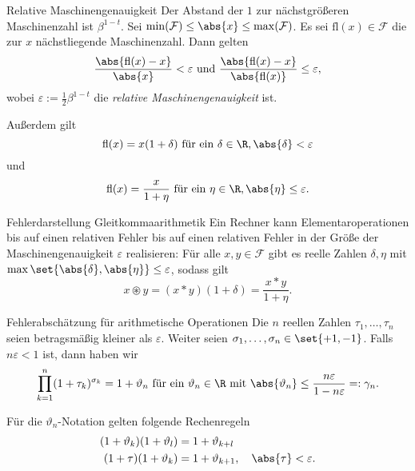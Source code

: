 \begin{karte}{Relative Maschinengenauigkeit}
    Der Abstand der \(1\) zur nächstgrößeren Maschinenzahl ist \( \beta^{1-t} \).
    Sei \( \min(\mathcal{F}) \leq \abs{x} \leq \max(\mathcal{F}) \). 
    Es sei \( \mathrm{fl}(x) \in \mathcal{F} \) die zur \(x\) nächstliegende Maschinenzahl.
    Dann gelten 
    \[ \frac{ \abs{\mathrm{fl}(x) - x} }{ \abs{x} } < \varepsilon \text{ und } 
    \frac{ \abs{ \mathrm{fl}(x) - x } }{\abs{ \mathrm{fl}(x) }} \leq \varepsilon,  \]
    wobei \( \varepsilon := \frac{1}{2} \beta^{1-t} \) die \textit{relative Maschinengenauigkeit} ist.

    Außerdem gilt 
    \[ \mathrm{fl}(x) = x(1 + \delta) \text{ für ein } \delta \in \R, \abs{\delta} < \varepsilon \]
    und 
    \[ \mathrm{fl}(x) = \frac{x}{1 + \eta} \text{ für ein } \eta \in \R, \abs{\eta} \leq \varepsilon. \]
\end{karte}

\begin{karte}{Fehlerdarstellung Gleitkommaarithmetik}
    Ein Rechner kann Elementaroperationen bis auf einen relativen Fehler bis auf einen 
    relativen Fehler in der Größe der Maschinengenauigkeit \( \varepsilon \) realisieren: 
    Für alle \( x,y\in \mathcal{F} \) gibt es reelle Zahlen \( \delta, \eta \) mit 
    \( \max\set{\abs{\delta}, \abs{\eta}} \leq \varepsilon \), sodass gilt 
    \[ x \circledast y = (x \ast y)(1 + \delta) = \frac{x \ast y}{1 + \eta}. \]
\end{karte}

\begin{karte}{Fehlerabschätzung für arithmetische Operationen}
    Die \( n \) reellen Zahlen \( \tau_1,\ldots, \tau_n \) seien betragsmäßig 
    kleiner als \( \varepsilon \). Weiter seien \( \sigma_1,\ldots,\sigma_n \in \set{+1,-1} \).
    Falls \( n\varepsilon < 1 \) ist, dann haben wir 
    \[ \prod_{k=1}^n (1 + \tau_k)^{\sigma_k} = 1 + \vartheta_n \text{ für ein } 
    \vartheta_n \in \R \text{ mit }
    \abs{ \vartheta_n } \leq \frac{n \varepsilon}{ 1 - n\varepsilon } =: \gamma_n. \]

    Für die \( \vartheta_n \)-Notation gelten folgende Rechenregeln 
    \begin{align*}
        (1 + \vartheta_k)(1 + \vartheta_l) &= 1 + \vartheta_{k+l} \\
        (1 + \tau)(1 + \vartheta_k) &= 1 + \vartheta_{k+1}, \quad \abs{\tau} < \varepsilon.
    \end{align*}
\end{karte}

